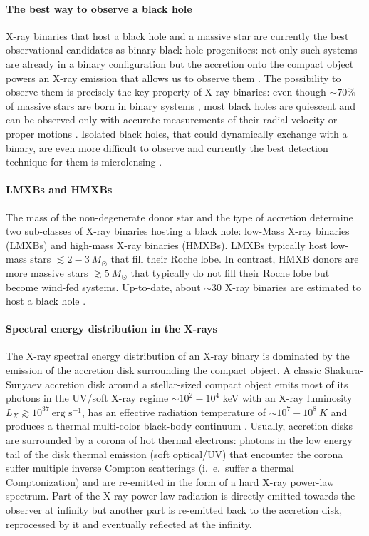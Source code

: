 \documentclass[a4paper,titlepage]{book}     	%
\newcommand{\sun}{\ensuremath{_\odot}}
\newcommand{\msun}{\ensuremath{M\sun}}
\begin{document}
\paragraph{The best way to observe a black hole}
X-ray binaries that host a black hole and a massive star are currently the best observational candidates as binary black hole progenitors: not only such systems are already in a binary configuration but the accretion onto the compact object powers an X-ray emission that allows us to observe them \cite{Xbinaries_massmeasure}. The possibility to observe them is precisely the key property of X-ray binaries: even though $\sim 70 \%$ of massive stars are born in binary systems \cite{Sana2012}, most black holes are quiescent and can be observed only with accurate measurements of their radial velocity or proper motions \cite{BHnoninteracting_Giesers2018}. Isolated black holes, that could dynamically exchange with a binary, are even more difficult to observe and currently the best detection technique for them is microlensing \cite{BHmicrolensing}.

\paragraph{LMXBs and HMXBs}
The mass of the non-degenerate donor star and the type of accretion determine two sub-classes of X-ray binaries hosting a black hole: low-Mass X-ray binaries (LMXBs) and high-mass X-ray binaries (HMXBs). LMXBs typically host low-mass stars $\lesssim 2-3~\msun$ that fill their Roche lobe. In contrast, HMXB  donors are more massive stars $\gtrsim 5~\msun$ that typically do not fill their Roche lobe but become wind-fed systems. Up-to-date, about $\sim 30$ X-ray binaries are estimated to host a black hole \cite{HMXBH_spins2021}.

\paragraph{Spectral energy distribution in the X-rays}
The X-ray spectral energy distribution of an X-ray binary is dominated by the emission of the accretion disk surrounding the compact object. A classic Shakura-Sunyaev accretion disk around a stellar-sized compact object emits most of its photons in the UV/soft X-ray regime $\sim 10^{2}-10^{4}$ keV with an X-ray luminosity $L_X \gtrsim 10^{37}~\text{erg s}^{-1}$, has an effective radiation temperature of $\sim 10^{7}-10^{8}~K$ and produces a thermal multi-color black-body continuum \cite{S&S1973_accretiondisk}. Usually, accretion disks are surrounded by a corona of hot thermal electrons: photons in the low energy tail of the disk thermal emission (soft optical/UV) that encounter the corona suffer multiple inverse Compton scatterings (i.\ e.\ suffer a thermal Comptonization) and are re-emitted in the form of a hard X-ray power-law spectrum. Part of the X-ray power-law radiation is directly emitted towards the observer at infinity but another part is re-emitted back to the accretion disk, reprocessed by it and eventually reflected at the infinity. 
 
\end{document}
